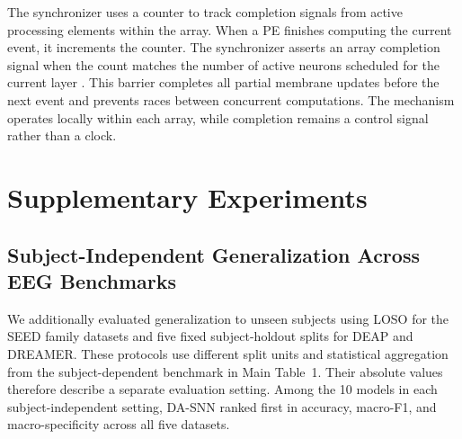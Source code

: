 \documentclass[12pt]{article}
\providecommand{\DIFaddtex}[1]{{\protect\color{blue}\sf #1}}
\providecommand{\DIFadd}[1]{\texorpdfstring{\DIFaddtex{#1}}{#1}}
\providecommand{\DIFaddbegin}{}
\providecommand{\DIFaddend}{}
\begin{document}
The synchronizer uses a counter to track completion signals from active processing elements within the array. When a PE finishes  \DIFaddbegin \DIFadd{computing }\DIFaddend the current event, it increments the counter.  \DIFaddbegin \DIFadd{The synchronizer asserts an array completion signal when the count }\DIFaddend matches the number of active neurons scheduled for the current layer . This barrier  \DIFaddbegin \DIFadd{completes }\DIFaddend all partial membrane updates  before the next event  \DIFaddbegin \DIFadd{and prevents races }\DIFaddend between concurrent computations.  \DIFaddbegin \DIFadd{The mechanism operates }\DIFaddend locally within each array,  \DIFaddbegin \DIFadd{while completion remains a control signal rather than a clock}\DIFaddend .
\section{Supplementary Experiments}

\subsection{ \DIFaddbegin \DIFadd{Subject-Independent Generalization Across EEG Benchmarks}\DIFaddend }\DIFaddbegin \label{supp:cross_subject}
\DIFaddend 

We  \DIFaddbegin \DIFadd{additionally evaluated generalization to unseen subjects using LOSO for the SEED family datasets and five fixed subject-holdout splits for DEAP and DREAMER. These protocols use different split units and statistical aggregation from the subject-dependent benchmark in Main Table~1. Their absolute values therefore describe a separate evaluation setting. Among the 10 models in each subject-independent setting, }\DIFaddend DA-SNN  \DIFaddbegin \DIFadd{ranked first in accuracy, macro-F1, and macro-specificity across all five datasets.
}
\end{document}
